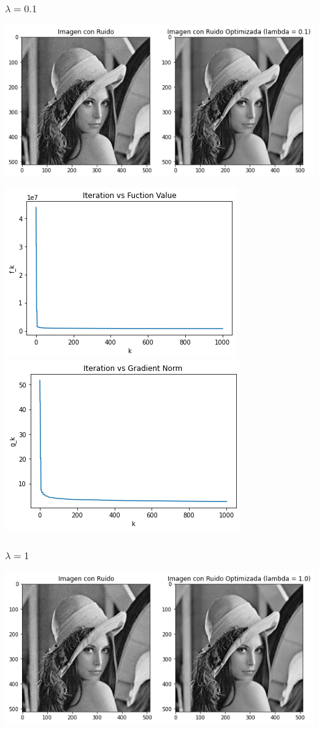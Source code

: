 \documentclass[11pt,letterpaper]{article}
\theoremstyle{definition}
\theoremstyle{definition}
\theoremstyle{definition}
\begin{document}
\subsubsection{$ \lambda = 0.1 $}
\begin{center}
	\includegraphics[width=0.75\linewidth]{graficas/fr/optimizada_0}
\end{center}

\begin{center}
	\includegraphics[width=0.6\linewidth]{graficas/fr/funcion_0}
	\includegraphics[width=0.6\linewidth]{graficas/fr/gradiente_0}
\end{center}

\subsubsection{$ \lambda = 1 $}
\begin{center}
	\includegraphics[width=0.7\linewidth]{graficas/fr/optimizada_1}
\end{center}
\end{document}
